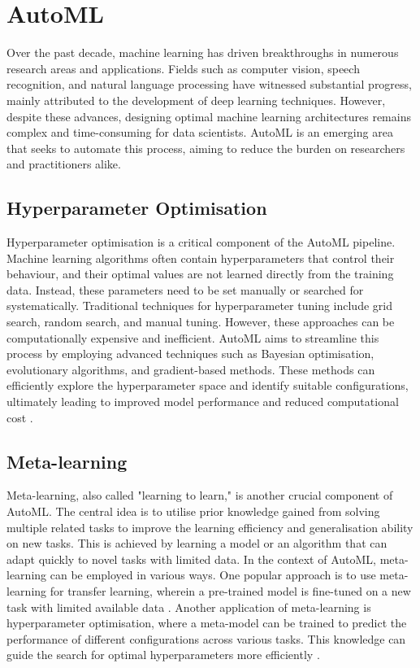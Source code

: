 \section{AutoML}\label{section:automl}

Over the past decade, machine learning has driven breakthroughs in numerous research areas and applications. Fields such as computer vision, speech recognition, and natural language processing have witnessed substantial progress, mainly attributed to the development of deep learning techniques. However, despite these advances, designing optimal machine learning architectures remains complex and time-consuming for data scientists. \Gls{AutoML} is an emerging area that seeks to automate this process, aiming to reduce the burden on researchers and practitioners alike. 

\subsection{Hyperparameter Optimisation}\label{subsection:hyperparameter-optimization}
Hyperparameter optimisation is a critical component of the AutoML pipeline. Machine learning algorithms often contain hyperparameters that control their behaviour, and their optimal values are not learned directly from the training data. Instead, these parameters need to be set manually or searched for systematically. Traditional techniques for hyperparameter tuning include grid search, random search, and manual tuning. However, these approaches can be computationally expensive and inefficient.
AutoML aims to streamline this process by employing advanced techniques such as Bayesian optimisation, evolutionary algorithms, and gradient-based methods. These methods can efficiently explore the hyperparameter space and identify suitable configurations, ultimately leading to improved model performance and reduced computational cost \autocite{bergstra2011algorithms, snoek2012practical}.

\subsection{Meta-learning}\label{subsection:meta-learning}
Meta-learning, also called "learning to learn," is another crucial component of AutoML. The central idea is to utilise prior knowledge gained from solving multiple related tasks to improve the learning efficiency and generalisation ability on new tasks. This is achieved by learning a model or an algorithm that can adapt quickly to novel tasks with limited data.
In the context of AutoML, meta-learning can be employed in various ways. One popular approach is to use meta-learning for transfer learning, wherein a pre-trained model is fine-tuned on a new task with limited available data \autocite{pan2010survey}. Another application of meta-learning is hyperparameter optimisation, where a meta-model can be trained to predict the performance of different configurations across various tasks. This knowledge can guide the search for optimal hyperparameters more efficiently \autocite{swersky2014freeze}.